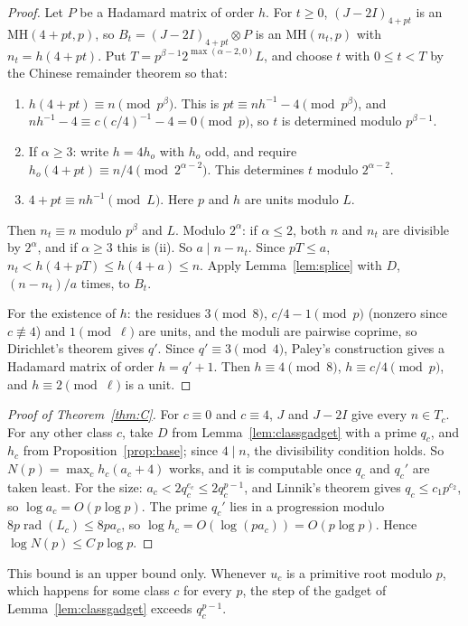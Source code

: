 \documentclass[10pt]{article}
\theoremstyle{remark}
\newcommand{\MH}{\mathrm{MH}}
\begin{document}
\begin{proof}
Let $P$ be a Hadamard matrix of order $h$. For $t\ge0$, $(J-2I)_{4+pt}$ is an $\MH(4+pt,p)$, so $B_t=(J-2I)_{4+pt}\otimes P$ is an $\MH(n_t,p)$ with $n_t=h(4+pt)$. Put $T=p^{\beta-1}2^{\max(\alpha-2,0)}L$, and choose $t$ with $0\le t<T$ by the Chinese remainder theorem so that:
\begin{enumerate}
\item[(i)] $h(4+pt)\equiv n\pmod{p^\beta}$. This is $pt\equiv nh^{-1}-4\pmod{p^\beta}$, and $nh^{-1}-4\equiv c(c/4)^{-1}-4=0\pmod p$, so $t$ is determined modulo $p^{\beta-1}$.
\item[(ii)] If $\alpha\ge3$: write $h=4h_o$ with $h_o$ odd, and require $h_o(4+pt)\equiv n/4\pmod{2^{\alpha-2}}$. This determines $t$ modulo $2^{\alpha-2}$.
\item[(iii)] $4+pt\equiv nh^{-1}\pmod L$. Here $p$ and $h$ are units modulo $L$.
\end{enumerate}
Then $n_t\equiv n$ modulo $p^\beta$ and $L$. Modulo $2^\alpha$: if $\alpha\le2$, both $n$ and $n_t$ are divisible by $2^\alpha$, and if $\alpha\ge3$ this is (ii). So $a\mid n-n_t$. Since $pT\le a$, $n_t<h(4+pT)\le h(4+a)\le n$. Apply Lemma~\ref{lem:splice} with $D$, $(n-n_t)/a$ times, to $B_t$.

For the existence of $h$: the residues $3\pmod8$, $c/4-1\pmod p$ (nonzero since $c\not\equiv4$) and $1\pmod\ell$ are units, and the moduli are pairwise coprime, so Dirichlet's theorem gives $q'$. Since $q'\equiv3\pmod4$, Paley's construction gives a Hadamard matrix of order $h=q'+1$. Then $h\equiv4\pmod8$, $h\equiv c/4\pmod p$, and $h\equiv2\pmod\ell$ is a unit.
\end{proof}

\begin{proof}[Proof of Theorem~\ref{thm:C}]
For $c\equiv0$ and $c\equiv4$, $J$ and $J-2I$ give every $n\in T_c$. For any other class $c$, take $D$ from Lemma~\ref{lem:classgadget} with a prime $q_c$, and $h_c$ from Proposition~\ref{prop:base}; since $4\mid n$, the divisibility condition holds. So $N(p)=\max_ch_c(a_c+4)$ works, and it is computable once $q_c$ and $q_c'$ are taken least. For the size: $a_c<2q_c^{e_c}\le2q_c^{p-1}$, and Linnik's theorem gives $q_c\le c_1p^{c_2}$, so $\log a_c=O(p\log p)$. The prime $q_c'$ lies in a progression modulo $8p\operatorname{rad}(L_c)\le8pa_c$, so $\log h_c=O(\log(pa_c))=O(p\log p)$. Hence $\log N(p)\le C\,p\log p$.
\end{proof}

This bound is an upper bound only. Whenever $u_c$ is a primitive root modulo $p$, which happens for some class $c$ for every $p$, the step of the gadget of Lemma~\ref{lem:classgadget} exceeds $q_c^{p-1}$.
\end{document}
